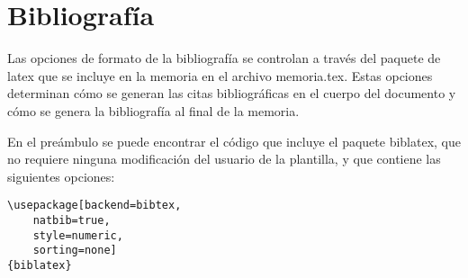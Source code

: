 %
%
%
%	
%	 
%	
%	 
%	 
%
%
%
\section{Bibliografía}
\label{sec:biblio}

Las opciones de formato de la bibliografía se controlan a través del paquete de latex  que se incluye en la memoria en el archivo memoria.tex.  Estas opciones determinan cómo se generan las citas bibliográficas en el cuerpo del documento y cómo se genera la bibliografía al final de la memoria.

En el preámbulo se puede encontrar el código que incluye el paquete biblatex, que no requiere ninguna modificación del usuario de la plantilla, y que contiene las siguientes opciones:

\begin{lstlisting}
\usepackage[backend=bibtex,
	natbib=true, 
	style=numeric, 
	sorting=none]
{biblatex}
\end{lstlisting}

